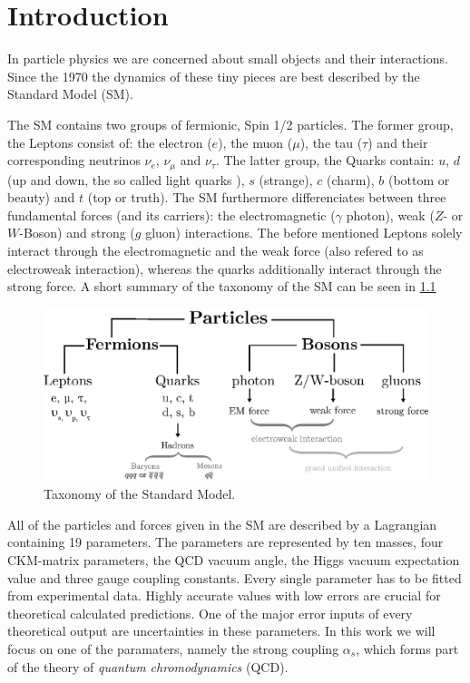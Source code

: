 \documentclass[../../index.tex]{subfiles}
\begin{document}
\chapter{Introduction}
In particle physics we are concerned about small objects and their interactions.
Since the 1970 the dynamics of these tiny pieces are best described by the Standard Model (SM).

The SM contains two groups of fermionic, Spin 1/2 particles. The former group,
the Leptons consist of: the electron ($e$), the muon ($\mu$), the tau ($\tau$)
and their corresponding neutrinos $\nu_e$, $\nu_\mu$ and $\nu_\tau$. The latter
group, the Quarks contain: $u$, $d$ (up and down, the so called light quarks ),
$s$ (strange), $c$ (charm), $b$ (bottom or beauty) and $t$ (top or truth). The SM
furthermore differenciates between three fundamental forces (and its carriers):
the electromagnetic ($\gamma$ photon), weak ($Z$- or $W$-Boson) and strong ($g$
gluon) interactions. The before mentioned Leptons solely interact through the
electromagnetic and the weak force (also refered to as electroweak interaction),
whereas the quarks additionally interact through the strong force. A short
summary of the taxonomy of the SM can be seen in \cref{fig:SMTaxonomy}
\begin{figure}
  \centering
  \includegraphics[width=\textwidth]{./images/standardModelTaxonomy.eps}
  \caption{Taxonomy of the Standard Model.}
  \label{fig:SMTaxonomy}
\end{figure}

All of the particles and forces given in the SM are described by a Lagrangian
containing 19 parameters. The parameters are represented by ten masses, four CKM-matrix parameters, the QCD vacuum
angle, the Higgs vacuum expectation value and three gauge coupling constants.
Every single parameter has to be fitted from experimental data. Highly accurate
values with low errors are crucial for theoretical calculated predictions. One
of the major error inputs of every theoretical output are uncertainties in these
parameters. In this work we will focus on one of the paramaters, namely the
strong coupling $\alpha_s$, which forms part of the theory of
\textit{quantum chromodynamics} (QCD).
\end{document}
